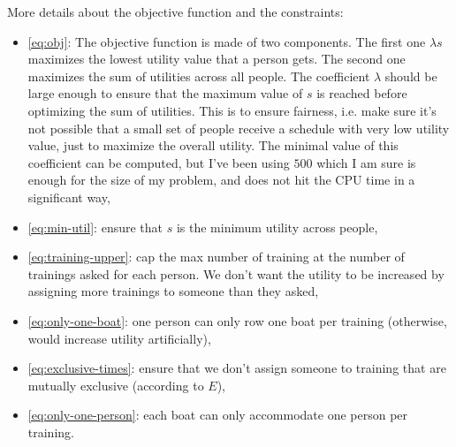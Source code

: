 \documentclass[12pt]{extarticle}
\begin{document}
\noindent More details about the objective function and the constraints:
\begin{itemize}
	\item \eqref{eq:obj}: The objective function is made of two components. The first one $\lambda s$ maximizes the lowest utility value that a person gets. The second one maximizes the sum of utilities across all people. The coefficient $\lambda$ should be large enough to ensure that the maximum value of $s$ is reached before optimizing the sum of utilities. This is to ensure fairness, i.e. make sure it's not possible that a small set of people receive a schedule with very low utility value, just to maximize the overall utility. The minimal value of this coefficient can be computed, but I've been using $500$ which I am sure is enough for the size of my problem, and does not hit the CPU time in a significant way,
	\item \eqref{eq:min-util}: ensure that $s$ is the minimum utility across people,
	\item \eqref{eq:training-upper}: cap the max number of training at the number of trainings asked for each person. We don't want the utility to be increased by assigning more trainings to someone than they asked,
	\item \eqref{eq:only-one-boat}: one person can only row one boat per training (otherwise, would increase utility artificially),
	\item \eqref{eq:exclusive-times}: ensure that we don't assign someone to training that are mutually exclusive (according to $E$),
	\item \eqref{eq:only-one-person}: each boat can only accommodate one person per training.
\end{itemize}
\end{document}
